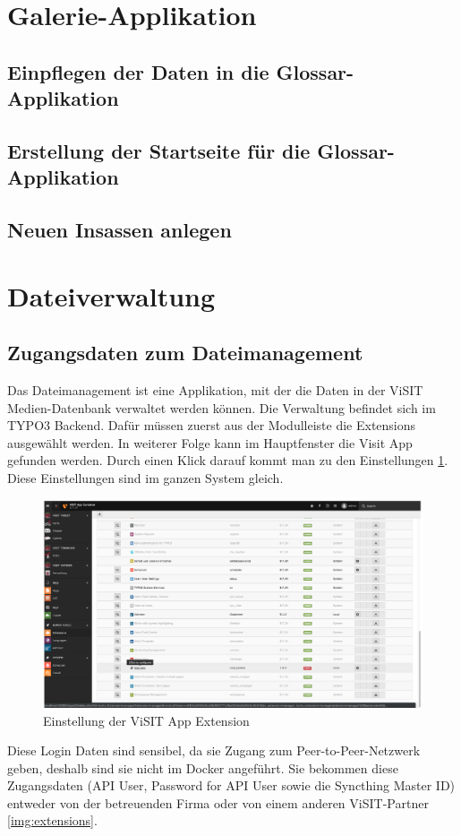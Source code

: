 \section{Galerie-Applikation}

\subsection{Einpflegen der Daten in die Glossar-Applikation}

\subsection{Erstellung der Startseite für die Glossar-Applikation}

\subsection{Neuen Insassen anlegen}






\section{Dateiverwaltung}

\subsection{Zugangsdaten zum Dateimanagement}
Das Dateimanagement ist eine Applikation, mit der die Daten in der ViSIT Medien-Datenbank verwaltet werden können. Die Verwaltung befindet sich im TYPO3 Backend. Dafür müssen zuerst aus der Modulleiste die Extensions ausgewählt werden. In weiterer Folge kann im Hauptfenster die Visit App gefunden werden. Durch einen Klick darauf kommt man zu den Einstellungen \ref{img:einstellung_extension}. Diese Einstellungen sind im ganzen System gleich.
\begin{figure}[ht!]
\centering
\includegraphics[width=12cm]{Figures/paula/dateiverwaltung/einstellung_extension.png}
\caption{Einstellung der ViSIT App Extension}
\label{img:einstellung_extension}
\end{figure}
Diese Login Daten sind sensibel, da sie Zugang zum Peer-to-Peer-Netzwerk geben, deshalb sind sie nicht im Docker angeführt. Sie bekommen diese Zugangsdaten (API User, Password for API User sowie die Syncthing Master ID) entweder von der betreuenden Firma oder von einem anderen ViSIT-Partner \ref{img:extensions}.\\

